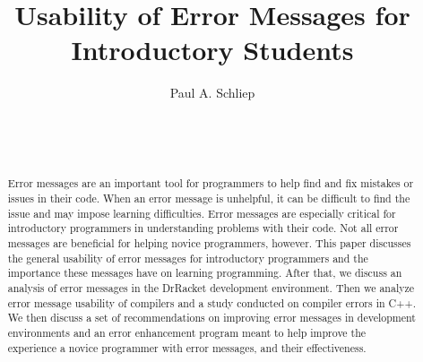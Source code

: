 \documentclass{sig-alternate}
\begin{document}

\title{Usability of Error Messages for Introductory Students}


\author{
\alignauthor
Paul A. Schliep\\
	\\
	\\
	\\
}

\maketitle
\begin{abstract}
Error messages are an important tool for programmers to help find and fix mistakes or issues in their code.
When an error message is unhelpful, it can be difficult to find the issue and may impose learning difficulties.
Error messages are especially critical for introductory programmers in understanding problems with their code.
Not all error messages are beneficial for helping novice programmers, however.
This paper discusses the general usability of error messages for introductory programmers and the importance these messages have on learning programming.
After that, we discuss an analysis of error messages in the DrRacket development environment.
Then we analyze error message usability of compilers and a study conducted on compiler errors in C++.
We then discuss a set of recommendations on improving error messages in development environments and an error enhancement program meant to help improve the experience a novice programmer with error messages, and their effectiveness.

\end{abstract}
\end{document}
